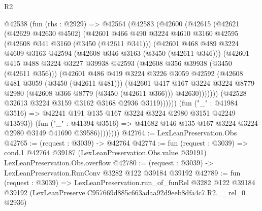 \begin{lexlean}{R2}
\begin{coremodule}
                      @42538
                        (fun (rhs : @2929) =>
                        @42564
                          (@42583
                            (@42600
                              (@42615
                                (@42621
                                  (@42629 @42630 @4502)
                                  (@42601
                                    @466
                                    @490
                                    @3224
                                    @4610
                                    @3160
                                    @42595
                                    (@42608 @341 @3160 (@3450 (@42611 @341)))
                                    (@42601
                                      @468
                                      @489
                                      @3224
                                      @4609
                                      @3163
                                      @42594
                                      (@42608 @346 @3163 (@3450 (@42611 @346)))
                                      (@42601
                                        @415
                                        @488
                                        @3224
                                        @3227
                                        @39938
                                        @42593
                                        (@42608 @356 @39938 (@3450 (@42611 @356)))
                                        (@42601
                                          @486
                                          @419
                                          @3224
                                          @3226
                                          @3059
                                          @42592
                                          (@42608 @481 @3059 (@3450 (@42611 @481)))
                                          (@42601
                                            @417
                                            @167
                                            @3224
                                            @3224
                                            @8779
                                            @2980
                                            (@42608 @366 @8779 (@3450 (@42611 @366)))
                                            @42630)))))))
                              (@42528 @32613 @3224 @3159 @3162 @3168 @2936 @3119))))))
                    (fun ("_" : @41984 @3516) =>
                    @42241 @191 @135 @167 @3224 @3224 @2980 @3151 @42249 @13593))
                  (fun ("_" : @41394 @3516) =>
                  @41682 @146 @135 @167 @3224 @3224 @2980 @3149 @41690 @39586))))))))
@42764 := LexLeanPreservation.Obs
@42765 := (request : @3039) -> @42764
@42774 := fun (request : @3039) =>
  cond.{1} @42764 @39187 (LexLeanPreservation.Obs.value @39191) LexLeanPreservation.Obs.overflow
@42780 := (request : @3039) -> LexLeanPreservation.RunConv @3282 @122 @39184 @39192
@42789 := fun (request : @3039) =>
  LexLeanPreservation.run_of_funRel
    @3282
    @122
    @39184
    @39192
    (LexLeanPreserve.C957669d885c663adaa92d9eeb8dfa4c7.R2.__rel_0 @2936)
\end{coremodule}
\end{lexlean}
